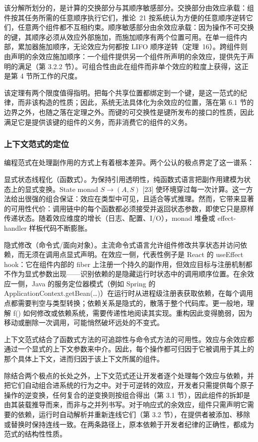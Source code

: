 \documentclass[
  10
]{article}
\begin{document}
该分解所划分的，是计算的交换部分与其顺序敏感部分。交换部分由效应承载：组件按其任务所需的任意顺序执行它们，推论~21 按系统认为方便的任意顺序逆转它们，任意两个组件都不互相约束。顺序敏感部分由余效应承载：因为操作不可交换的键，其顺序必须从效应外部施加，而施加顺序有两个位置可用。在单一组件内部，累加器施加顺序，无论效应为何都按 LIFO 顺序逆转（定理~16）。跨组件则由声明的余效应施加顺序：一个组件提供另一个组件所声明的余效应，提供先于声明的满足（第 3.2.2 节）。可组合性由此在组件而非单个效应的粒度上获得，这正是第 4 节所工作的尺度。

该定理有两个限度值得指明。把每个共享位置都绑定到一个键，是这一范式的纪律，而非该构造的性质；因此，系统无法具体化为余效应的位置，落在第 6.1 节的边界之外，也随之落在定理之外。而键的可交换性是键所发布的接口的性质，因此满足它是提供该键的组件的义务，而非消费它的组件的义务。

\subsubsection{上下文范式的定位} \label{situating-the-context-paradigm}

编程范式在处理副作用的方式上有着根本差异。两个公认的极点界定了这一谱系：

显式状态线程化（函数式）。为保持引用透明性，纯函数式语言把副作用建模为状态上的显式变换。State monad \(S \to ( A , S )\) [23] 使环境穿过每一次计算。这一方法给出很强的组合保证：效应在类型中可见，且适合等式推理。然而，它带来显著的可用性代价：调用链中的每个函数都必须接受并返回状态参数，即使它只是原样传递状态。随着效应维度的增长（日志、配置、I/O），monad 堆叠或 effect-handler 样板代码不断膨胀。

隐式修改（命令式/面向对象）。主流命令式语言允许组件修改共享状态并访问依赖，而无须在调用点显式声明。在效应一侧，代表性例子是 React 的 useEffect hook：它在组件内部的 fiber 上注册一个持久的副作用，但效应目标与注册机制都不作为显式参数出现——识别依赖的是隐藏运行时状态中的调用顺序位置。在余效应一侧，Java 的服务定位器模式（例如 Spring 的 ApplicationContext.getBean(\ldots)）在运行时从进程级注册表获取依赖，在每个调用点都需要判空与类型转换；依赖关系是隐式的，散落于整个代码库。更一般地，理解 f() 如何修改或依赖系统，需要传递性地阅读其实现。重构因此变得脆弱，因为移动或删除一次调用，可能悄然破坏远处的不变式。

上下文范式结合了函数式方法的可追踪性与命令式方法的可用性。效应与余效应都通过一个显式的上下文参数来中介。因此，每个操作都可归因于它被调用于其上的那个具体上下文，进而归因于该上下文所属的组件。

除结合两个极点的长处之外，上下文范式还让开发者逐个处理每个效应与依赖，并把它们自动组合进系统的行为之中。对于可逆转的效应，开发者只需提供每个原子操作的逆变换，任何复合的逆变换则按组合得出（第 3.1 节），因此组件的拆卸是由其装载推导而来，而非与之并列书写。对于响应式的余效应，组件只需声明它需要的依赖，运行时自动解析并重新连线它们（第 3.2 节），在提供者被添加、移除或替换时保持连线一致。在两条路径上，原本依赖于开发者纪律的正确性，都成为范式的结构性性质。
\end{document}
